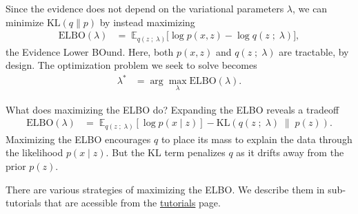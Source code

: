 Since the evidence does not depend on the variational parameters $\lambda$,
we can minimize $\text{KL}(q\|p)$ by instead maximizing
\begin{align*}
  \text{ELBO}(\lambda)
  &=\;
  \mathbb{E}_{q(z\;;\;\lambda)}
  \big[
  \log p(x, z)
  -
  \log q(z\;;\;\lambda)
  \big],
\end{align*}
the Evidence Lower BOund. Here, both $p(x,z)$ and $q(z\;;\;\lambda)$ are
tractable, by design. The optimization problem we seek to solve becomes
\begin{align*}
  \lambda^*
  &=
  \arg \max_\lambda \text{ELBO}(\lambda).
\end{align*}

What does maximizing the ELBO do? Expanding the ELBO reveals a tradeoff
\begin{align*}
  \text{ELBO}(\lambda) 
  &=\;
  \mathbb{E}_{q(z \;;\; \lambda)}[\log p(x \mid z)]  
  - \text{KL}(q(z \;;\; \lambda) \;\|\; p(z)).
\end{align*}
Maximizing the ELBO encourages $q$ to place its mass to explain the data through
the likelihood $p(x \mid z)$. But the KL term penalizes $q$ as it drifts away
from the prior $p(z)$. 

There are various strategies of maximizing the ELBO.
We describe them in sub-tutorials that are acessible from the
\href{tutorials.html}{tutorials} page.
